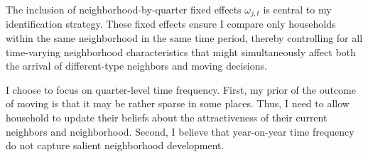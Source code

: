 \documentclass[../main.tex]{subfiles}
\begin{document}
The inclusion of neighborhood-by-quarter fixed effects $\omega_{j,t}$ is central to my identification strategy. These fixed effects ensure I compare only households within the same neighborhood in the same time period, thereby controlling for all time-varying neighborhood characteristics that might simultaneously affect both the arrival of different-type neighbors and moving decisions.

I choose to focus on quarter-level time frequency. First, my prior of the outcome of moving is that it may be rather sparse in some places. Thus, I need to allow household to update their beliefs about the attractiveness of their current neighbors and neighborhood. Second, I believe that year-on-year time frequency do not capture salient neighborhood development.  
\end{document}

